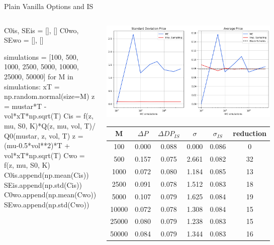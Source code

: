 \documentclass{beamer}
\begin{document}
\begin{frame}[fragile]{Plain Vanilla Options and IS}
\begin{columns}
\begin{ipython}[linewidth=\linewidth]
C0is, SEis = [], []
C0wo, SEwo = [], []

simulations = [100, 500, 1000, 2500, 5000, 10000, 25000, 50000]
for M in simulations:
    xT = np.random.normal(size=M)
    z = mustar*T - vol*xT*np.sqrt(T)
    Cis = f(z, mu, S0, K)*Q(z, mu, vol, T)/
    Q0(mustar, z, vol, T)
    z = (mu-0.5*vol**2)*T + vol*xT*np.sqrt(T)
    Cwo = f(z, mu, S0, K)
    C0is.append(np.mean(Cis))
    SEis.append(np.std(Cis))
    C0wo.append(np.mean(Cwo))
    SEwo.append(np.std(Cwo))
\end{ipython}
\begin{center}
	\includegraphics[width=0.95\linewidth]{images/is_call_results}
	\tiny{
		\begin{tabular}{|c|c|c|c|c|c|}
			\hline
			M & $\Delta P$ & $\Delta DP_{IS}$ & $\sigma$ & $\sigma_{IS}$ & reduction \\
			\hline
			100&  0.000&  0.088&  0.000&  0.086&   0\\
			\hline
			500&  0.157&  0.075&  2.661&  0.082&  32\\
			\hline
			1000&  0.072&  0.080&  1.184&  0.085&  13\\
			\hline
			2500&  0.091&  0.078&  1.512&  0.083&  18\\
			\hline
			5000&  0.107&  0.079&  1.625&  0.084&  19\\
			\hline
			10000&  0.072&  0.078&  1.308&  0.084&  15\\
			\hline
			25000&  0.080&  0.079&  1.238&  0.083&  15\\
			\hline
			50000&  0.084&  0.079&  1.344&  0.083&  16\\
			\hline
	\end{tabular}}
\end{center}
\end{columns}
\end{frame}
\end{document}
